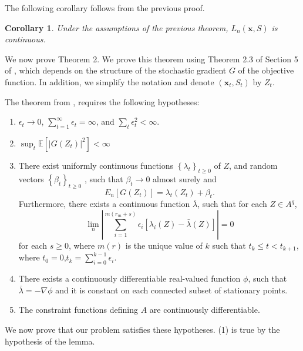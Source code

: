 \documentclass[letterpaper]{article}
\newcommand{\E}{\mathbb{E}}
\newcommand{\stcomment}[1]{{\color{red} PF: #1}}
\newcommand{\pfedit}[1]{{\color{blue} #1}}
\newcommand{\cost}{c}
\newcommand{\x}{\mathbf{x}}
\renewcommand{\S}{S}
\newcommand{\A}{A}
\newtheorem{corollary}{Corollary}
\theoremstyle{definition}
\numberwithin{equation}{section}
\begin{document}
The following corollary follows from the previous proof.

\begin{corollary}
Under the assumptions of the previous theorem, $L_{n}(\x,\S)$ is continuous.
\end{corollary}

We now prove Theorem 2.
\proof{}
We prove this theorem using Theorem 2.3 of Section 5 of \citet{kushner2003stochastic}, which depends on the structure of the stochastic gradient  $G$ of the objective function. 
In addition, we simplify the notation and denote $(\x_t,\S_t)$  by $Z_t$. %

The theorem from \citet{kushner2003stochastic}, requires the following hypotheses:
\begin{enumerate}
\item $\epsilon_{t}\rightarrow0$, $\sum_{t=1}^{\infty}\epsilon_{t}=\infty$,
and $\sum_{t}\epsilon_{t}^{2}<\infty$.
\item $\sup_{t}\E\left[\left|G\left(Z_{t}\right)\right|^{2}\right]<\infty$
\item There exist uniformly continuous functions $\left\{ \lambda_{t}\right\} _{t\geq0}$
of $Z$, and random vectors $\left\{ \beta_{t}\right\} _{t\geq0}$
, such that $\beta_{t}\rightarrow0$ almost surely and
\[
E_{n}\left[G\left(Z_{t}\right)\right]=\lambda_{t}\left(Z_{t}\right)+\beta_{t}.
\]
Furthermore, there exists a continuous function $\bar{\lambda}$,
such that for each $Z\in \A^{q}$,
\[
\lim_{n}\left|\sum_{i=1}^{m\left(r_{m}+s\right)}\epsilon_{i}\left[\lambda_{i}\left(Z\right)-\bar{\lambda}\left(Z\right)\right]\right|=0
\]
for each $s\geq0$, where $m\left(r\right)$ is the unique value of
$k$ such that $t_{k}\leq t<t_{k+1}$, where $t_{0}=0$,$t_{k}=\sum_{i=0}^{k-1}\epsilon_{i}$.
\item There exists a continuously differentiable real-valued function $\phi$,
such that $\bar{\lambda}=-\nabla\phi$ and it is constant on each
connected subset of stationary points.
\item The constraint functions defining $\A$ are continuously differentiable.
\end{enumerate}
We now prove that our problem satisfies these hypotheses. (1) is true
by the hypothesis of the lemma. 
\end{document}

